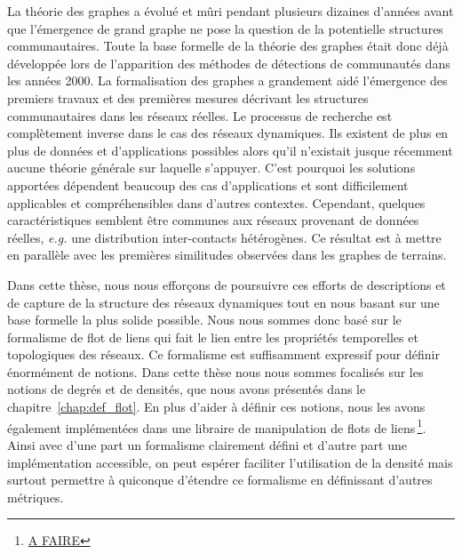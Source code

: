 La théorie des graphes a évolué et mûri pendant plusieurs dizaines d'années avant que l'émergence de grand graphe ne pose la question de la potentielle structures communautaires.
Toute la base formelle de la théorie des graphes était donc déjà développée lors de l'apparition des méthodes de détections de communautés dans les années 2000.
La formalisation des graphes a grandement aidé l'émergence des premiers travaux et des premières mesures décrivant les structures communautaires dans les réseaux réelles.
Le processus de recherche est complètement inverse dans le cas des réseaux dynamiques.
Ils existent de plus en plus de données et d'applications possibles alors qu'il n'existait jusque récemment aucune théorie générale sur laquelle s'appuyer.
C'est pourquoi les solutions apportées dépendent beaucoup des cas d'applications et sont difficilement applicables et compréhensibles dans d'autres contextes.
Cependant, quelques caractéristiques semblent être communes aux réseaux provenant de données réelles, \emph{e.g.} une distribution inter-contacts hétérogènes.
Ce résultat est à mettre en parallèle avec les premières similitudes observées dans les graphes de terrains.

\bigskip


Dans cette thèse, nous nous efforçons de poursuivre ces efforts de descriptions et de capture de la structure des réseaux dynamiques tout en nous basant sur une base formelle la plus solide possible.
Nous nous sommes donc basé sur le formalisme de flot de liens qui fait le lien entre les propriétés temporelles et topologiques des réseaux.
Ce formalisme est suffisamment expressif pour définir énormément de notions.
Dans cette thèse nous nous sommes focalisés sur les notions de degrés et de densités, que nous avons présentés dans le chapitre~\ref{chap:def_flot}.
En plus d'aider à définir ces notions, nous les avons également implémentées dans une libraire de manipulation de flots de liens\,\footnote{\url{A FAIRE}}.
Ainsi avec d'une part un formalisme clairement défini et d'autre part une implémentation accessible, on peut espérer faciliter l'utilisation de la densité mais surtout permettre à quiconque d'étendre ce formalisme en définissant d'autres métriques.

